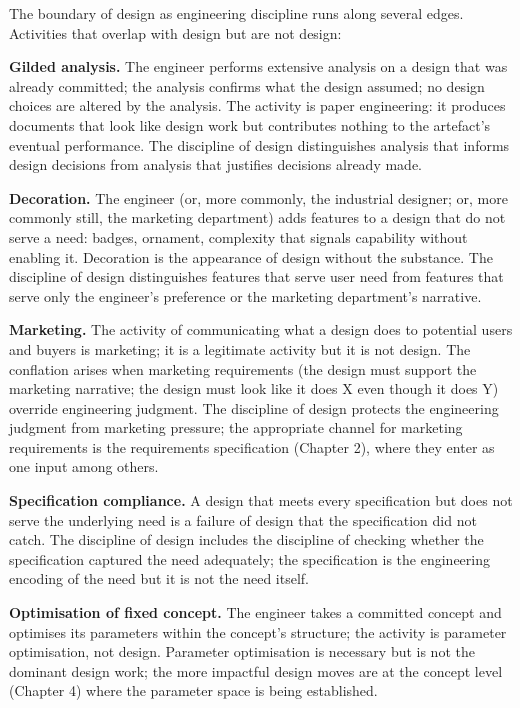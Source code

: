 The boundary of design as engineering discipline runs along several edges. Activities that overlap with design but are not design:

\textbf{Gilded analysis.} The engineer performs extensive analysis on a design that was already committed; the analysis confirms what the design assumed; no design choices are altered by the analysis. The activity is paper engineering: it produces documents that look like design work but contributes nothing to the artefact's eventual performance. The discipline of design distinguishes analysis that informs design decisions from analysis that justifies decisions already made.

\textbf{Decoration.} The engineer (or, more commonly, the industrial designer; or, more commonly still, the marketing department) adds features to a design that do not serve a need: badges, ornament, complexity that signals capability without enabling it. Decoration is the appearance of design without the substance. The discipline of design distinguishes features that serve user need from features that serve only the engineer's preference or the marketing department's narrative.

\textbf{Marketing.} The activity of communicating what a design does to potential users and buyers is marketing; it is a legitimate activity but it is not design. The conflation arises when marketing requirements (the design must support the marketing narrative; the design must look like it does X even though it does Y) override engineering judgment. The discipline of design protects the engineering judgment from marketing pressure; the appropriate channel for marketing requirements is the requirements specification (Chapter 2), where they enter as one input among others.

\textbf{Specification compliance.} A design that meets every specification but does not serve the underlying need is a failure of design that the specification did not catch. The discipline of design includes the discipline of checking whether the specification captured the need adequately; the specification is the engineering encoding of the need but it is not the need itself.

\textbf{Optimisation of fixed concept.} The engineer takes a committed concept and optimises its parameters within the concept's structure; the activity is parameter optimisation, not design. Parameter optimisation is necessary but is not the dominant design work; the more impactful design moves are at the concept level (Chapter 4) where the parameter space is being established.

